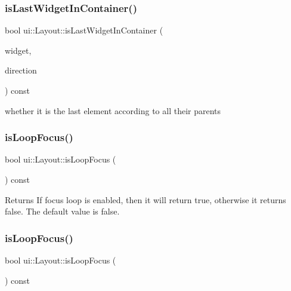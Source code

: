 \subsubsection{\texorpdfstring{is\+Last\+Widget\+In\+Container()}{isLastWidgetInContainer()}\hspace{0.1cm}{\footnotesize\ttfamily [2/2]}}
{\footnotesize\ttfamily bool ui\+::\+Layout\+::is\+Last\+Widget\+In\+Container (\begin{DoxyParamCaption}\item[{\hyperlink{classui_1_1Widget}{Widget} $\ast$}]{widget,  }\item[{\hyperlink{classui_1_1Widget_a8ae8e8fc793a04a87584205cd1e8a8a5}{Focus\+Direction}}]{direction }\end{DoxyParamCaption}) const\hspace{0.3cm}{\ttfamily [protected]}}

whether it is the last element according to all their parents \mbox{\label{classui_1_1Layout_a68b58a782140967c44016b1060c4c111}} 
\subsubsection{\texorpdfstring{is\+Loop\+Focus()}{isLoopFocus()}\hspace{0.1cm}{\footnotesize\ttfamily [1/2]}}
{\footnotesize\ttfamily bool ui\+::\+Layout\+::is\+Loop\+Focus (\begin{DoxyParamCaption}{ }\end{DoxyParamCaption}) const}

\begin{DoxyReturn}{Returns}
If focus loop is enabled, then it will return true, otherwise it returns false. The default value is false. 
\end{DoxyReturn}
\mbox{\label{classui_1_1Layout_a68b58a782140967c44016b1060c4c111}} 
\subsubsection{\texorpdfstring{is\+Loop\+Focus()}{isLoopFocus()}\hspace{0.1cm}{\footnotesize\ttfamily [2/2]}}
{\footnotesize\ttfamily bool ui\+::\+Layout\+::is\+Loop\+Focus (\begin{DoxyParamCaption}{ }\end{DoxyParamCaption}) const}

